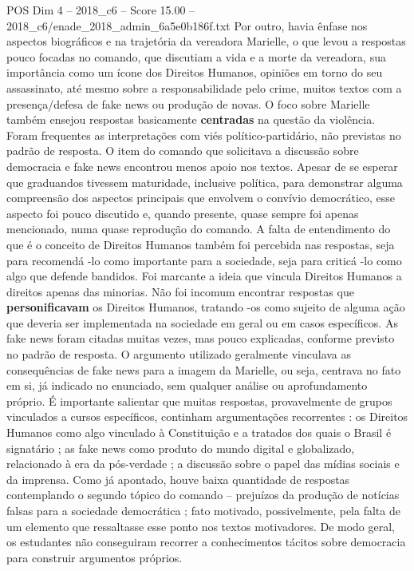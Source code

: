 \begin{textsample}{POS Dim 4 – 2018\_c6 – Score 15.00 – 2018\_c6/enade\_2018\_admin\_6a5e0b186f.txt}
Por outro, havia ênfase nos aspectos biográficos e na trajetória da vereadora Marielle, o que levou a respostas pouco focadas no comando, que discutiam a vida e a morte da vereadora, sua importância como um ícone dos Direitos Humanos, opiniões em torno do seu assassinato, até mesmo sobre a responsabilidade pelo crime, muitos textos com a presença/defesa de fake news ou produção de novas.
O foco sobre Marielle também ensejou respostas basicamente \textbf{centradas} na questão da violência.
Foram frequentes as interpretações com viés político-partidário, não previstas no padrão de resposta.
O item do comando que solicitava a discussão sobre democracia e fake news encontrou menos apoio nos textos.
Apesar de se esperar que graduandos tivessem maturidade, inclusive política, para demonstrar alguma compreensão dos aspectos principais que envolvem o convívio democrático, esse aspecto foi pouco discutido e, quando presente, quase sempre foi apenas mencionado, numa quase reprodução do comando.
A falta de entendimento do que é o conceito de Direitos Humanos também foi percebida nas respostas, seja para recomendá -lo como importante para a sociedade, seja para criticá -lo como algo que defende bandidos.
Foi marcante a ideia que vincula Direitos Humanos a direitos apenas das minorias.
Não foi incomum encontrar respostas que \textbf{personificavam} os Direitos Humanos, tratando -os como sujeito de alguma ação que deveria ser implementada na sociedade em geral ou em casos específicos.
As fake news foram citadas muitas vezes, mas pouco explicadas, conforme previsto no padrão de resposta.
O argumento utilizado geralmente vinculava as consequências de fake news para a imagem da Marielle, ou seja, centrava no fato em si, já indicado no enunciado, sem qualquer análise ou aprofundamento próprio.
É importante salientar que muitas respostas, provavelmente de grupos vinculados a cursos específicos, continham argumentações recorrentes : os Direitos Humanos como algo vinculado à Constituição e a tratados dos quais o Brasil é signatário ; as fake news como produto do mundo digital e globalizado, relacionado à era da pós-verdade ; a discussão sobre o papel das mídias sociais e da imprensa.
Como já apontado, houve baixa quantidade de respostas contemplando o segundo tópico do comando – prejuízos da produção de notícias falsas para a sociedade democrática ; fato motivado, possivelmente, pela falta de um elemento que ressaltasse esse ponto nos textos motivadores.
De modo geral, os estudantes não conseguiram recorrer a conhecimentos tácitos sobre democracia para construir argumentos próprios.

\end{textsample}
